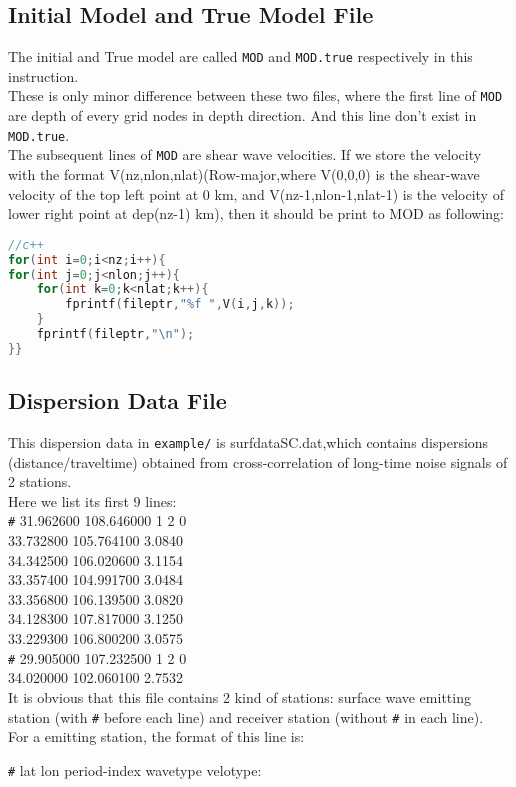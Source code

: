 \documentclass[UTF8]{article}
\begin{document}
    \subsection{Initial Model and True Model File}
    The initial and True model are called \verb!MOD! and \verb!MOD.true! respectively in this instruction.\\
    These is only minor difference between these two files, where the first line of \verb!MOD!
     are depth of every grid nodes in depth direction. And this line don't exist in \verb!MOD.true!.\\

    The subsequent lines of \verb!MOD! are shear wave velocities. If we store the velocity with the 
    format V(nz,nlon,nlat)(Row-major,where V(0,0,0) is the shear-wave velocity of the 
    top left point at 0 km, and V(nz-1,nlon-1,nlat-1) is the velocity of 
    lower right point at dep(nz-1) km), then it should be print to MOD as following:
    \begin{lstlisting}[language=c++]
//c++
for(int i=0;i<nz;i++){
for(int j=0;j<nlon;j++){
    for(int k=0;k<nlat;k++){
        fprintf(fileptr,"%f ",V(i,j,k));
    }
    fprintf(fileptr,"\n");
}} 
  \end{lstlisting}

  \subsection{Dispersion Data File}
  This dispersion data in \verb!example/! is surfdataSC.dat,which contains dispersions (distance/traveltime) 
  obtained from cross-correlation of long-time noise signals of 2 stations. \\
   Here we list its first 9 lines:\\
   \verb!#!  31.962600 108.646000 1 2 0\\
    33.732800 105.764100 3.0840\\
    34.342500 106.020600 3.1154\\
    33.357400 104.991700 3.0484\\
    33.356800 106.139500 3.0820\\
    34.128300 107.817000 3.1250\\
    33.229300 106.800200 3.0575\\
    \verb!#! 29.905000 107.232500 1 2 0\\
    34.020000 102.060100 2.7532\\

    It is obvious that this file contains 2 kind of stations: surface wave emitting 
    station (with \verb!#! before each line) and receiver station (without \verb!#! in each line). \\
    For a emitting station, the format of this line is:\\
    \begin{center}
        \verb!#! lat lon period-index wavetype velotype:
    \end{center}
\end{document}

